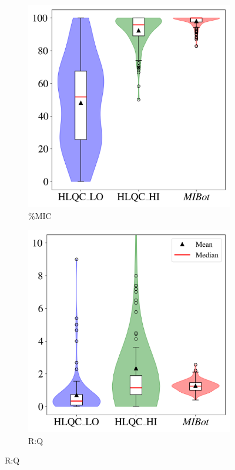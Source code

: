 \begin{figure}[ht]
\centering
\begin{subfigure}[b]{0.9\textwidth}
\centering
\includegraphics[height=0.25\textheight, keepaspectratio]{fig/mic.png}
\caption{\%MIC}
\end{subfigure}

\begin{subfigure}[b]{0.9\textwidth}
\centering
\includegraphics[height=0.25\textheight, keepaspectratio]{fig/rq.png}
\caption{R:Q}
\end{subfigure}


\end{figure}
